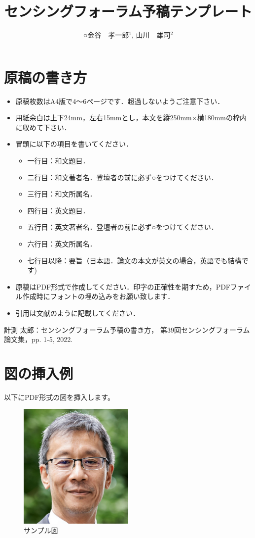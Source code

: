 \documentclass[a4paper]{jarticle}
\title{センシングフォーラム予稿テンプレート}
\author{○金谷　孝一郎$^1$, 山川　雄司$^2$}
\affiliation{
$^1$ 東京大学,
$^2$ 東京大学 }
\begin{document}
\maketitle
\section{原稿の書き方}
\begin{itemize}
\item 原稿枚数はA4版で4～6ページです．超過しないようご注意下さい．
\item 用紙余白は上下24mm，左右15mmとし，本文を縦250mm×横180mmの枠内に収めて下さい．
\item 冒頭に以下の項目を書いてください．
\begin{itemize}
\item 一行目：和文題目．
\item 二行目：和文著者名．登壇者の前に必ず○をつけてください．
\item 三行目：和文所属名．
\item 四行目：英文題目．
\item 五行目：英文著者名．登壇者の前に必ず○をつけてください．
\item 六行目：英文所属名．
\item 七行目以降：要旨（日本語．論文の本文が英文の場合，英語でも結構です)
\end{itemize}
\item 原稿はPDF形式で作成してください．印字の正確性を期すため，PDFファイル作成時にフォントの埋め込みをお願い致します．
\item 引用は文献\cite{ref1}のように記載してください．
\end{itemize}
\begin{thebibliography}{9}
計測 太郎：センシングフォーラム予稿の書き方，
第39回センシングフォーラム論文集，pp. 1-5, 2022.
\end{thebibliography}
\section{図の挿入例}
以下にPDF形式の図を挿入します。

\begin{figure}[htbp]
    \centering
    \includegraphics[width=0.5\textwidth]{example.pdf}
    \caption{サンプル図}
    \label{fig:sample}
\end{figure}
\end{document}
